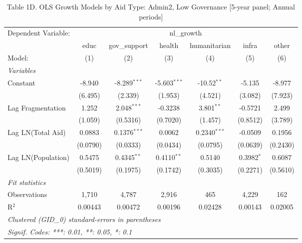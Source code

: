 
\begin{table}[H]
   \caption{Table 1D. OLS Growth Models by Aid Type: Admin2, Low Governance [5-year panel; Annual periods]}
   \centering
   \begin{tabular}{lcccccc}
      \tabularnewline \midrule \midrule
      Dependent Variable: & \multicolumn{6}{c}{nl\_growth}\\
                         & educ     & gov\_support   & health         & humanitarian   & infra        & other \\   
      Model:             & (1)      & (2)            & (3)            & (4)            & (5)          & (6)\\  
      \midrule
      \emph{Variables}\\
      Constant           & -8.940   & -8.289$^{***}$ & -5.603$^{***}$ & -10.52$^{**}$  & -5.135       & -8.977\\   
                         & (6.495)  & (2.339)        & (1.953)        & (4.521)        & (3.082)      & (7.923)\\   
      Lag Fragmentation  & 1.252    & 2.048$^{***}$  & -0.3238        & 3.801$^{**}$   & -0.5721      & 2.499\\   
                         & (1.059)  & (0.5316)       & (0.7020)       & (1.457)        & (0.8512)     & (3.789)\\   
      Lag LN(Total Aid)  & 0.0883   & 0.1376$^{***}$ & 0.0062         & 0.2340$^{***}$ & -0.0509      & 0.1956\\   
                         & (0.0790) & (0.0333)       & (0.0434)       & (0.0795)       & (0.0639)     & (0.2430)\\   
      Lag LN(Population) & 0.5475   & 0.4345$^{**}$  & 0.4110$^{**}$  & 0.5140         & 0.3982$^{*}$ & 0.6087\\   
                         & (0.5019) & (0.1975)       & (0.1742)       & (0.3035)       & (0.2271)     & (0.5610)\\   
      \midrule
      \emph{Fit statistics}\\
      Observations       & 1,710    & 4,787          & 2,916          & 465            & 4,229        & 162\\  
      R$^2$              & 0.00443  & 0.00472        & 0.00196        & 0.02428        & 0.00143      & 0.02005\\  
      \midrule \midrule
      \multicolumn{7}{l}{\emph{Clustered (GID\_0) standard-errors in parentheses}}\\
      \multicolumn{7}{l}{\emph{Signif. Codes: ***: 0.01, **: 0.05, *: 0.1}}\\
   \end{tabular}
\end{table}


